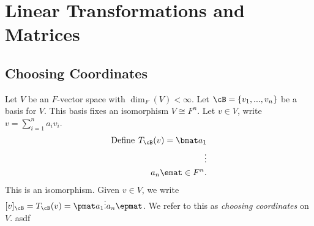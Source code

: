 \chapter{Linear Transformations and Matrices}\label{chapter:Linear Transformations and Matrices}

\vspace{12pt}
\section{Choosing Coordinates}\label{sec:Choosing Coordinates}
    \begin{example}
        Let $V$ be an $F$-vector space with $\dim_F{(V)} < \infty$. Let $\cB = \{v_1,...,v_n\}$ be a basis for $V$. This basis fixes an isomorphism $V \cong F^n$. Let $v \in V$, write $v = \sum_{i = 1}^n a_i v_i$. 
            \begin{equation*}
            \begin{split}
                \text{Define}\hspace{4pt} T_\cB(v) = \bmat a_1 \\ \vdots \\ a_n \emat \in F^n.
            \end{split}
            \end{equation*}
        This is an isomorphism. Given $v \in V$, we write $[v]_\cB = T_\cB(v) = \pmat a_1 \\ \vdots \\ a_n \epmat$. We refer to this as \textit{choosing coordinates} on $V$.
        asdf
    \end{example}

